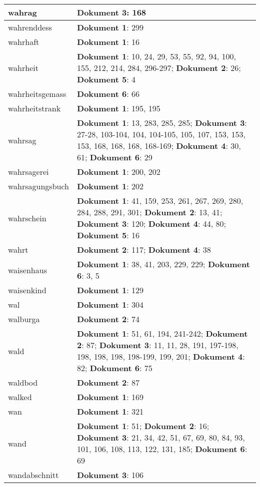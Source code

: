 \documentclass[a5paper]{article}
\begin{document}
\begin{longtable}[l]{|l|p{3in}|}
\hline
wahrag & \textbf{Dokument 3}: 168 \\
\hline
wahrenddess & \textbf{Dokument 1}: 299 \\
\hline
wahrhaft & \textbf{Dokument 1}: 16 \\
\hline
wahrheit & \textbf{Dokument 1}: 10, 24, 29, 53, 55, 92, 94, 100, 155, 212, 214, 284, 296-297; \textbf{Dokument 2}: 26; \textbf{Dokument 5}: 4 \\
\hline
wahrheitsgemass & \textbf{Dokument 6}: 66 \\
\hline
wahrheitstrank & \textbf{Dokument 1}: 195, 195 \\
\hline
wahrsag & \textbf{Dokument 1}: 13, 283, 285, 285; \textbf{Dokument 3}: 27-28, 103-104, 104, 104-105, 105, 107, 153, 153, 153, 168, 168, 168, 168-169; \textbf{Dokument 4}: 30, 61; \textbf{Dokument 6}: 29 \\
\hline
wahrsagerei & \textbf{Dokument 1}: 200, 202 \\
\hline
wahrsagungsbuch & \textbf{Dokument 1}: 202 \\
\hline
wahrschein & \textbf{Dokument 1}: 41, 159, 253, 261, 267, 269, 280, 284, 288, 291, 301; \textbf{Dokument 2}: 13, 41; \textbf{Dokument 3}: 120; \textbf{Dokument 4}: 44, 80; \textbf{Dokument 5}: 16 \\
\hline
wahrt & \textbf{Dokument 2}: 117; \textbf{Dokument 4}: 38 \\
\hline
waisenhaus & \textbf{Dokument 1}: 38, 41, 203, 229, 229; \textbf{Dokument 6}: 3, 5 \\
\hline
waisenkind & \textbf{Dokument 1}: 129 \\
\hline
wal & \textbf{Dokument 1}: 304 \\
\hline
walburga & \textbf{Dokument 2}: 74 \\
\hline
wald & \textbf{Dokument 1}: 51, 61, 194, 241-242; \textbf{Dokument 2}: 87; \textbf{Dokument 3}: 11, 11, 28, 191, 197-198, 198, 198, 198, 198-199, 199, 201; \textbf{Dokument 4}: 82; \textbf{Dokument 6}: 75 \\
\hline
waldbod & \textbf{Dokument 2}: 87 \\
\hline
walked & \textbf{Dokument 1}: 169 \\
\hline
wan & \textbf{Dokument 1}: 321 \\
\hline
wand & \textbf{Dokument 1}: 51; \textbf{Dokument 2}: 16; \textbf{Dokument 3}: 21, 34, 42, 51, 67, 69, 80, 84, 93, 101, 106, 108, 113, 122, 131, 185; \textbf{Dokument 6}: 69 \\
\hline
wandabschnitt & \textbf{Dokument 3}: 106 \\

\end{longtable}
\end{document}
